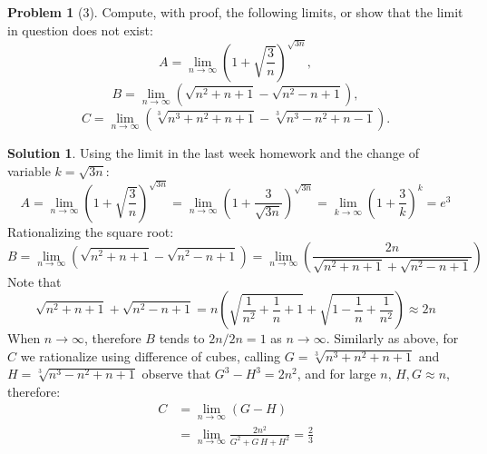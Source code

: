 \documentclass{article}
\theoremstyle{definition}
\newtheorem*{soln}{Solution}
\newtheorem*{prob}{Problem}
\theoremstyle{theorem}
\begin{document}
\begin{prob}[3]
Compute, with proof, the following limits, or show that the limit in question does not exist:
\[ A = \lim_{n \rightarrow \infty} \left(1 + \sqrt{\frac{3}{n}}\right)^{\sqrt{3n}},\]
\[ B = \lim_{n \rightarrow \infty} \left(\sqrt{n^2 + n + 1}  - \sqrt{n^2 - n + 1}\right),\]
\[ C = \lim_{n \rightarrow \infty} \left(\sqrt[3]{n^3 + n^2 + n + 1}  - \sqrt[3]{n^3 - n^2 + n - 1}\right). \]
\end{prob}
\begin{soln}
    Using the limit in the last week homework and the change of variable $k=\sqrt{3n}$:
    \[ A = \lim_{n \rightarrow \infty} \left(1 + \sqrt{\frac{3}{n}}\right)^{\sqrt{3n}}= \lim_{n \rightarrow \infty} \left(1 + \frac3{\sqrt{3n}}\right)^{\sqrt{3n}}=\lim_{k \rightarrow \infty} \left(1 + \frac3{k}\right)^{k}= e^3\]
    Rationalizing the square root:
    \[ B = \lim_{n \rightarrow \infty} \left(\sqrt{n^2 + n + 1}  - \sqrt{n^2 - n + 1}\right)= \lim_{n \rightarrow \infty} \left(\frac {2n}{\sqrt{n^2 + n + 1}  + \sqrt{n^2 - n + 1}}\right)\]
    Note that $$\sqrt{n^2 + n + 1}  + \sqrt{n^2 - n + 1}=n\left(\sqrt{\frac 1{n^2} + \frac 1n + 1}  + \sqrt{1 - \frac 1n + \frac 1{n^2}}\right) \approx 2n  $$
    When $n\to \infty$, therefore $B$ tends to $2n/2n=1$ as $n\to \infty$.
    Similarly as above, for $C$ we rationalize using difference of cubes, calling $G = \sqrt[3]{n^3 + n^2 + n + 1} $ and $H=\sqrt[3]{n^3 - n^2 + n + 1} $ observe that $G^3-H^3= 2n^2$, and for large  $n$, $H,G \approx n$, therefore:
    \begin{align*} C &= \lim_{n \rightarrow \infty} \left(G  - H\right)\\ 
        &=  \lim_{n \rightarrow \infty} \frac {2n^2}{G^2 +G\, H +H^2} = \frac 23
    \end{align*}

\end{soln}
\vspace{1in}
\end{document}
